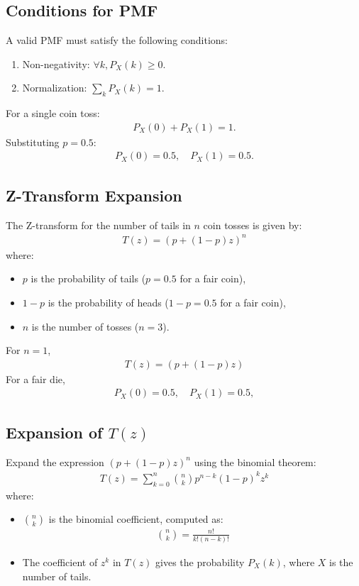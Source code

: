 \documentclass[journal]{IEEEtran}
\begin{document}
\subsection*{Conditions for PMF}
A valid PMF must satisfy the following conditions:
\begin{enumerate}
    \item Non-negativity: \(\forall k, P_X(k) \geq 0\).
    \item Normalization: \(\sum_{k} P_X(k) = 1\).
\end{enumerate}
For a single coin toss:
\begin{align}
P_X(0) + P_X(1) = 1.
\end{align}
Substituting \(p = 0.5\):
\begin{align}
P_X(0) = 0.5, \quad P_X(1) = 0.5.
\end{align}

\subsection*{Z-Transform Expansion}
The Z-transform for the number of tails in \(n\) coin tosses is given by:
\begin{align}
T(z) = \left( p + (1-p)z \right)^n
\end{align}
where:
\begin{itemize}
    \item \(p\) is the probability of tails (\(p = 0.5\) for a fair coin),
    \item \(1-p\) is the probability of heads (\(1-p = 0.5\) for a fair coin),
    \item \(n\) is the number of tosses (\(n = 3\)).
\end{itemize}
For $n=1$,
\begin{align}
T(z) = \left( p + (1-p)z \right)
\end{align}
For a fair die,
\begin{align}
P_X(0) = 0.5, \quad P_X(1) = 0.5,
\end{align}
\subsection*{Expansion of \(T(z)\)}
Expand the expression \(\left( p + (1-p)z \right)^n\) using the binomial theorem:
\begin{align}
T(z) = \sum_{k=0}^{n} \binom{n}{k} p^{n-k} (1-p)^k z^k
\end{align}
where:
\begin{itemize}
    \item \(\binom{n}{k}\) is the binomial coefficient, computed as:
    \begin{align}
    \binom{n}{k} = \frac{n!}{k! (n-k)!}
    \end{align}
    \item The coefficient of \(z^k\) in \(T(z)\) gives the probability \(P_X(k)\), where \(X\) is the number of tails.
\end{itemize}
\end{document}
